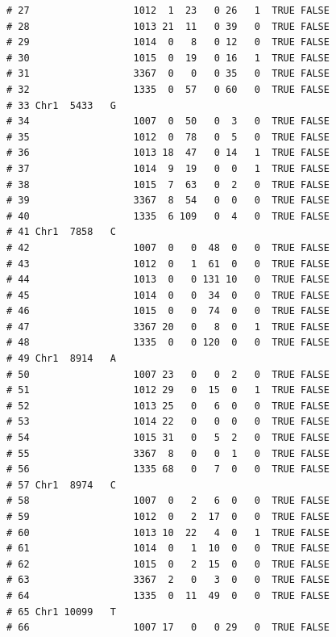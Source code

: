 \documentclass{article}\usepackage[]{graphicx}\usepackage[]{color}
\makeatletter
\newenvironment{kframe}{%
 \def\at@end@of@kframe{}%
 \ifinner\ifhmode%
  \def\at@end@of@kframe{\end{minipage}}%
  \begin{minipage}{\columnwidth}%
 \fi\fi%
 \def\FrameCommand##1{\hskip\@totalleftmargin \hskip-\fboxsep
 \colorbox{shadecolor}{##1}\hskip-\fboxsep
     \hskip-\linewidth \hskip-\@totalleftmargin \hskip\columnwidth}%
 \MakeFramed {\advance\hsize-\width
   \@totalleftmargin\z@ \linewidth\hsize
   \@setminipage}}%
 {\par\unskip\endMakeFramed%
 \at@end@of@kframe}
\newenvironment{knitrout}{}{} %
\makeatother
\begin{document}
\begin{knitrout}
\begin{kframe}
\begin{verbatim}
# 27                  1012  1  23   0 26   1  TRUE FALSE        
# 28                  1013 21  11   0 39   0  TRUE FALSE        
# 29                  1014  0   8   0 12   0  TRUE FALSE        
# 30                  1015  0  19   0 16   1  TRUE FALSE        
# 31                  3367  0   0   0 35   0  TRUE FALSE        
# 32                  1335  0  57   0 60   0  TRUE FALSE        
# 33 Chr1  5433   G                                             
# 34                  1007  0  50   0  3   0  TRUE FALSE        
# 35                  1012  0  78   0  5   0  TRUE FALSE        
# 36                  1013 18  47   0 14   1  TRUE FALSE        
# 37                  1014  9  19   0  0   1  TRUE FALSE        
# 38                  1015  7  63   0  2   0  TRUE FALSE        
# 39                  3367  8  54   0  0   0  TRUE FALSE        
# 40                  1335  6 109   0  4   0  TRUE FALSE        
# 41 Chr1  7858   C                                             
# 42                  1007  0   0  48  0   0  TRUE FALSE        
# 43                  1012  0   1  61  0   0  TRUE FALSE        
# 44                  1013  0   0 131 10   0  TRUE FALSE        
# 45                  1014  0   0  34  0   0  TRUE FALSE        
# 46                  1015  0   0  74  0   0  TRUE FALSE        
# 47                  3367 20   0   8  0   1  TRUE FALSE        
# 48                  1335  0   0 120  0   0  TRUE FALSE        
# 49 Chr1  8914   A                                             
# 50                  1007 23   0   0  2   0  TRUE FALSE        
# 51                  1012 29   0  15  0   1  TRUE FALSE        
# 52                  1013 25   0   6  0   0  TRUE FALSE        
# 53                  1014 22   0   0  0   0  TRUE FALSE        
# 54                  1015 31   0   5  2   0  TRUE FALSE        
# 55                  3367  8   0   0  1   0  TRUE FALSE        
# 56                  1335 68   0   7  0   0  TRUE FALSE        
# 57 Chr1  8974   C                                             
# 58                  1007  0   2   6  0   0  TRUE FALSE        
# 59                  1012  0   2  17  0   0  TRUE FALSE        
# 60                  1013 10  22   4  0   1  TRUE FALSE        
# 61                  1014  0   1  10  0   0  TRUE FALSE        
# 62                  1015  0   2  15  0   0  TRUE FALSE        
# 63                  3367  2   0   3  0   0  TRUE FALSE        
# 64                  1335  0  11  49  0   0  TRUE FALSE        
# 65 Chr1 10099   T                                             
# 66                  1007 17   0   0 29   0  TRUE FALSE        

\end{verbatim}
\end{kframe}
\end{knitrout}
\end{document}
